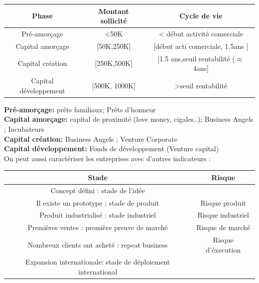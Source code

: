 \documentclass[12pt,oneside,a4paper]{article}
\begin{document}
\vspace{1cm}
\begin{tabular}{|c|c|c|} 
	\hline
	 Phase & Montant sollicité & Cycle de vie\\
	 \hline
	 Pré-amorçage & <50K & < début activité comerciale\\
	 \hline
	 Capital amorçage & [50K,250K] & [début acti comerciale, 1.5ans ]\\
	 \hline
	 Capital création & [250K,500K] & [1.5 ans,seuil rentabilité ($\approx$4ans]\\
	 \hline
	 Capital développement & [500K, 1000K[ & >seuil rentabilité\\
	 \hline
\end{tabular} 
\vspace{1cm}

\noindent
\textbf{Pré-amorçage:} prêts familiaux; Prêts d'honneur \\
\textbf{Capital amorçage:} capital de proximité (love money, cigales..); Business Angels ; Incubateurs\\
\textbf{Capital création: }Business Angels ; Venture Corporate\\
\textbf{Capital développement:} Fonds de développement (Venture capital)\\

On peut aussi caractériser les entreprises avec d'autres indicateurs : 

\vspace{1cm}
\begin{center}
\begin{tabular}{|c|c|}
	\hline
	Stade & Risque\\
	\hline
	Concept défini : stade de l'idée & \\
	\hline
	Il existe un prototype : stade de produit & Risque produit\\
	\hline
	Produit industrialisé : stade industriel & Risque industriel\\
	\hline
	Premières ventes : première preuve de marché & Risque de marché\\
	\hline
	Nombreux clients ont acheté : repeat business & Risque d'éxecution\\
	\hline
	Expansion internationale: stade de déploiement international & \\
	\hline

\end{tabular}
\end{center}
\vspace{1cm}
\end{document}
